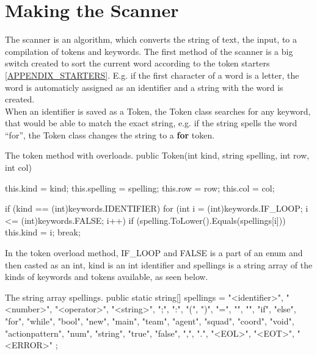 \section{Making the Scanner}
The scanner is an algorithm, which converts the string of text, the input, to a compilation of tokens and keywords. The first method of the scanner is a big switch created to sort the current word according to the token starters \ref{APPENDIX_STARTERS}. E.g. if the first character of a word is a letter, the word is automaticly assigned as an identifier and a string with the word is created.\\
When an identifier is saved as a Token, the Token class searches for any keyword, that would be able to match the exact string, e.g. if the string spells the word "`for"', the Token class changes the string to a \textbf{for} token.\\

\begin{source}{The token method with overloads.}{}
public Token(int kind, string spelling, int row, int col)
        {
            this.kind = kind;
            this.spelling = spelling;
            this.row = row;
            this.col = col;

            if (kind == (int)keywords.IDENTIFIER)
            {
                for (int i = (int)keywords.IF_LOOP; i <= (int)keywords.FALSE; i++)
                {
                    if (spelling.ToLower().Equals(spellings[i]))
                    {
                        this.kind = i;
                        break;
                    }
                }
            }
        }
\end{source}
In the token overload method, IF\_LOOP and FALSE is a part of an enum and then casted as an int, kind is an int identifier and spellings is a string array of the kinds of keywords and tokens available, as seen below.

\begin{source}{The string array spellings.}{}
public static string[] spellings = 
        {
            "<identifier>", "<number>", "<operator>", "<string>", ";", ":", "(", ")", "=", "{", "}", 
            "if", "else", "for", "while", "bool", "new", "main", "team", "agent", "squad", "coord", "void", 
            "actionpattern", "num", "string", "true", "false", ",", ".", "<EOL>", "<EOT>", "<ERROR>"                         
        };
\end{source}

